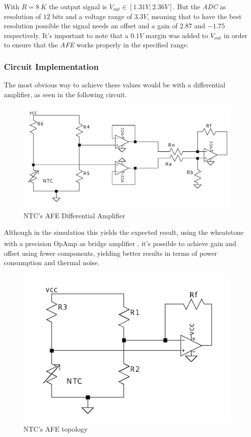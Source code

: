 \documentclass[12pt]{article}
\begin{document}
    With $R=8~K$ the output signal is $V_{out} \in [1.31V;2.36V]$. 
    But the \textit{ADC} as resolution of $12$ bits and a voltage range of $3.3V$, meaning that to have the best resolution possible the signal needs an offset and a gain of $2.87$ and $-1.75$ respectively. 
    It's important to note that a $0.1V$ margin was added to $V_{out}$ in order to ensure that the \textit{AFE} works properly in the specified range.
    
    \subsubsection{Circuit Implementation}
    \label{AFENTCCirc}
    The most obvious way to achieve these values would be with a differential amplifier, 
    as seen in the following circuit.

     \begin{figure}[H] 
        \centering
        \includegraphics*[scale = 0.25]{images/AFENTCDiffAmp.png}
        \caption{NTC's AFE Differential Amplifier}
        \label{difafentc}
    \end{figure}

    Although in the simulation this yields the expected result, using the wheatstone with a precision OpAmp as bridge amplifier \textsuperscript{\cite{SensorSignalConditioning}}, it's possible to achieve gain and offset using fewer components, yielding better results in terms of power consumption and thermal noise. 

    
    \begin{figure}[H] 
        \centering
        \includegraphics*[scale = 0.25]{images/AFENTC.png}
        \caption{NTC's AFE topology}
        \label{AFENTC}
    \end{figure}
\end{document}
